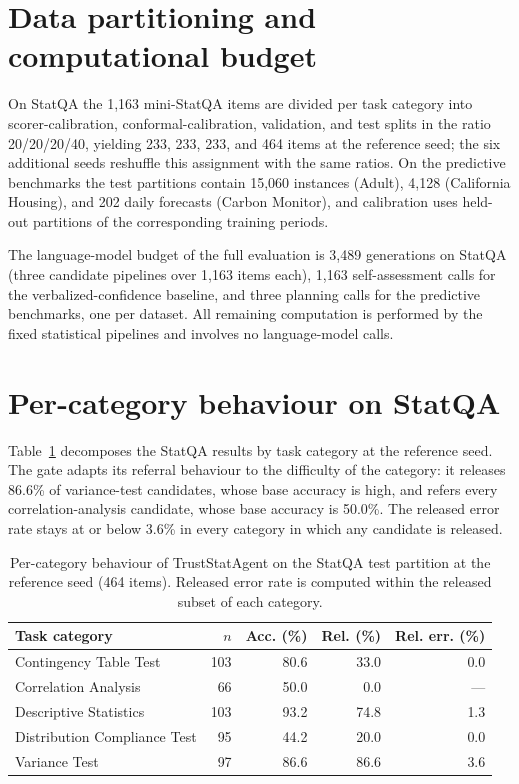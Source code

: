 \documentclass[preprint,12pt,authoryear]{elsarticle}
\begin{document}
\section{Data partitioning and computational budget}
\label{app:budget}

On StatQA the 1{,}163 mini-StatQA items are divided per task category into scorer-calibration, conformal-calibration, validation, and test splits in the ratio 20/20/20/40, yielding 233, 233, 233, and 464 items at the reference seed; the six additional seeds reshuffle this assignment with the same ratios.
On the predictive benchmarks the test partitions contain 15{,}060 instances (Adult), 4{,}128 (California Housing), and 202 daily forecasts (Carbon Monitor), and calibration uses held-out partitions of the corresponding training periods.

The language-model budget of the full evaluation is 3{,}489 generations on StatQA (three candidate pipelines over 1{,}163 items each), 1{,}163 self-assessment calls for the verbalized-confidence baseline, and three planning calls for the predictive benchmarks, one per dataset.
All remaining computation is performed by the fixed statistical pipelines and involves no language-model calls.

\section{Per-category behaviour on StatQA}
\label{app:category}

Table~\ref{tab:statqa_categories} decomposes the StatQA results by task category at the reference seed.
The gate adapts its referral behaviour to the difficulty of the category: it releases 86.6\% of variance-test candidates, whose base accuracy is high, and refers every correlation-analysis candidate, whose base accuracy is 50.0\%.
The released error rate stays at or below 3.6\% in every category in which any candidate is released.

\begin{table}[H]
    \centering
    \caption{Per-category behaviour of TrustStatAgent on the StatQA test partition at the reference seed (464 items). Released error rate is computed within the released subset of each category.}
    \label{tab:statqa_categories}
    \small
    \setlength{\tabcolsep}{7pt}
    \renewcommand{\arraystretch}{1.15}
    \begin{tabular}{@{}lrrrr@{}}
        \toprule
        \textbf{Task category} & \textbf{$n$} & \textbf{Acc. (\%)} & \textbf{Rel. (\%)} & \textbf{Rel. err. (\%)} \\
        \midrule
        Contingency Table Test & 103 & 80.6 & 33.0 & 0.0 \\
        Correlation Analysis & 66 & 50.0 & 0.0 & --- \\
        Descriptive Statistics & 103 & 93.2 & 74.8 & 1.3 \\
        Distribution Compliance Test & 95 & 44.2 & 20.0 & 0.0 \\
        Variance Test & 97 & 86.6 & 86.6 & 3.6 \\
        \bottomrule
    \end{tabular}
\end{table}



\end{document}
